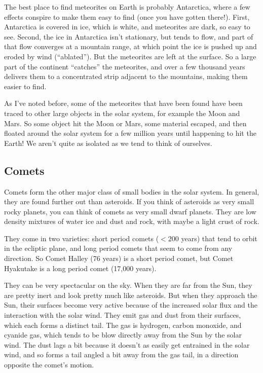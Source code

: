 \documentclass[12pt, preprint]{aastex}
\begin{document}
The best place to find meteorites on Earth is probably Antarctica,
where a few effects conspire to make them easy to find (once you have
gotten there!). First, Antarctica is covered in ice, which is white,
and meteorites are dark, so easy to see. Second, the ice in Antarctica
isn't stationary, but tends to flow, and part of that flow converges
at a mountain range, at which point the ice is pushed up and eroded by
wind (``ablated''). But the meteorites are left at the surface. So a
large part of the continent ``catches'' the meteorites, and over a few
thousand years delivers them to a concentrated strip adjacent to the
mountains, making them easier to find. 

As I've noted before, some of the meteorites that have been found have
been traced to other large objects in the solar system, for example
the Moon and Mars. So some object hit the Moon or Mars, some material
escaped, and then floated around the solar system for a few million
years until happening to hit the Earth! We aren't quite as isolated as
we tend to think of ourselves.

\subsection{Comets}

Comets form the other major class of small bodies in the solar
system. In general, they are found further out than asteroids.  If you
think of asteroids as very small rocky planets, you can think of
comets as very small dwarf planets. They are low density mixtures of
water ice and dust and rock, with maybe a light crust of rock.

They come in two varieties: short period comets ($<200$ years) that
tend to orbit in the ecliptic plane, and long period comets that seem
to come from any direction. So Comet Halley (76 years) is a short
period comet, but Comet Hyakutake is a long period comet (17,000
years). 

They can be very spectacular on the sky. When they are far from the
Sun, they are pretty inert and look pretty much like asteroids. But
when they approach the Sun, their surfaces become very active because
of the increased solar flux and the interaction with the solar
wind. They emit gas and dust from their surfaces, which each forms a
distinct tail. The gas is hydrogen, carbon monoxide, and cyanide gas,
which tends to be blow directly away from the Sun by the solar
wind. The dust lags a bit because it doesn't as easily get entrained
in the solar wind, and so forms a tail angled a bit away from the gas
tail, in a direction opposite the comet's motion. 
\end{document}
